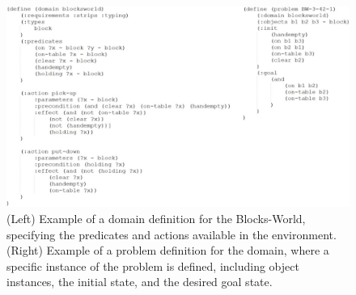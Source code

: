 \begin{figure}[t]
    \centering
    \includegraphics[width=1.0\textwidth]{figures/images/ch4/domain_problem.jpg}
    \caption{(Left) Example of a domain definition for the Blocks-World, specifying the predicates and actions available in the environment. (Right) Example of a problem definition for the domain, where a specific instance of the problem is defined, including object instances, the initial state, and the desired goal state.}
    \label{fig:domain_problem}
\end{figure}
